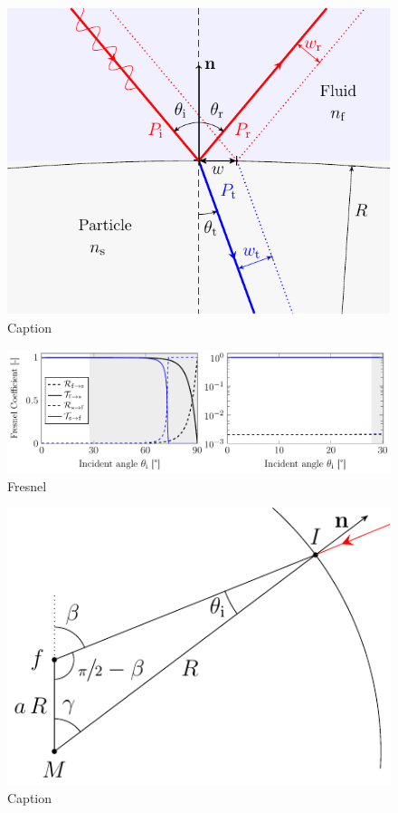 \begin{figure}[htp]
  \centering
  \includegraphics[]{Plots/cache/Snell.pdf}
  \caption{Caption}
  \label{fig:Th-snell}
\end{figure}


\lipsum[1-2]

\begin{figure}[htp]
  \centering
  \includegraphics[]{Plots/cache/Fresnel.pdf}
  \caption{Fresnel}
  \label{fig:Th-fresnel}
\end{figure}

\lipsum[1-2]

\begin{figure}[htp]
  \centering
  \includegraphics[]{Plots/cache/angles.pdf}
  \caption{Caption}
  \label{fig:Th-angles}
\end{figure}

